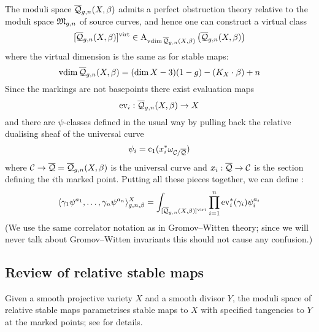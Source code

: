 The moduli space $\overline{\mathcal Q}_{g,n}(X,\beta)$ admits a perfect obstruction theory relative to the moduli space $\mathfrak M_{g,n}$ of source curves, and hence one can construct a virtual class
\begin{equation*} [\overline{\mathcal Q}_{g,n}(X,\beta)]^{\operatorname{virt}} \in \operatorname{A}_{\operatorname{vdim}\overline{\mathcal Q}_{g,n}(X,\beta)} \left( \overline{\mathcal Q}_{g,n}(X,\beta) \right) \end{equation*}
where the virtual dimension is the same as for stable maps:
\begin{equation*} \operatorname{vdim}\overline{\mathcal Q}_{g,n}(X,\beta) = (\dim{X} - 3)(1-g) - (K_X \cdot \beta) + n \end{equation*}
Since the markings are not basepoints there exist evaluation maps
\begin{equation*} \operatorname{ev}_i : \overline{\mathcal Q}_{g,n}(X,\beta) \rightarrow X \end{equation*}
and there are $\psi$-classes defined in the usual way by pulling back the relative dualising sheaf of the universal curve
\begin{equation*} \psi_i = \operatorname{c}_1(x_i^* \omega_{\mathcal{C}/\overline{\mathcal{Q}}}) \end{equation*}
where $\mathcal{C} \rightarrow \overline{\mathcal{Q}} = \overline{\mathcal Q}_{g,n}(X,\beta)$ is the universal curve and $x_i : \overline{\mathcal{Q}} \rightarrow \mathcal{C}$ is the section defining the $i$th marked point. Putting all these pieces together, we can define :
\begin{equation*} \langle \gamma_1 \psi^{a_1} , \ldots, \gamma_n \psi^{a_n} \rangle_{g,n,\beta}^X = \int_{[\overline{\mathcal Q}_{g,n}(X,\beta)]^{\operatorname{virt}}} \prod_{i=1}^n \operatorname{ev}_i^* (\gamma_i) \psi_i^{a_i} \end{equation*}
(We use the same correlator notation as in Gromov--Witten theory; since we will never talk about Gromov--Witten invariants this should not cause any confusion.)

\subsection{Review of relative stable maps} \label{Subsection relative stable maps} Given a smooth projective variety $X$ and a smooth divisor $Y$, the moduli space of relative stable maps parametrises stable maps to $X$ with specified tangencies to $Y$ at the marked points; see \cite{Ga} for details.

